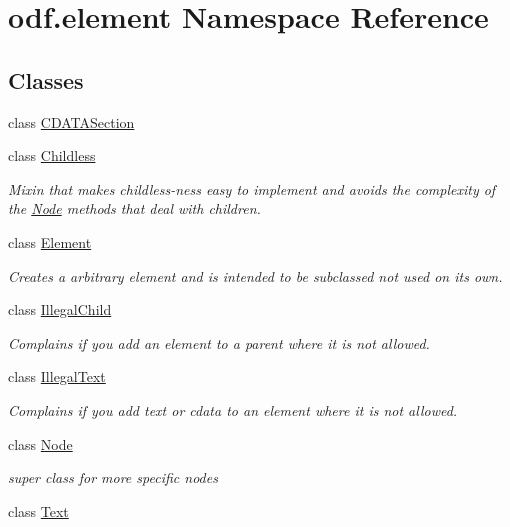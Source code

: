 \hypertarget{namespaceodf_1_1element}{\section{odf.\+element Namespace Reference}
\label{namespaceodf_1_1element}
}
\subsection*{Classes}
\begin{DoxyCompactItemize}
\item 
class \hyperlink{classodf_1_1element_1_1CDATASection}{C\+D\+A\+T\+A\+Section}
\item 
class \hyperlink{classodf_1_1element_1_1Childless}{Childless}
\begin{DoxyCompactList}\small\item\em Mixin that makes childless-\/ness easy to implement and avoids the complexity of the \hyperlink{classodf_1_1element_1_1Node}{Node} methods that deal with children. \end{DoxyCompactList}\item 
class \hyperlink{classodf_1_1element_1_1Element}{Element}
\begin{DoxyCompactList}\small\item\em Creates a arbitrary element and is intended to be subclassed not used on its own. \end{DoxyCompactList}\item 
class \hyperlink{classodf_1_1element_1_1IllegalChild}{Illegal\+Child}
\begin{DoxyCompactList}\small\item\em Complains if you add an element to a parent where it is not allowed. \end{DoxyCompactList}\item 
class \hyperlink{classodf_1_1element_1_1IllegalText}{Illegal\+Text}
\begin{DoxyCompactList}\small\item\em Complains if you add text or cdata to an element where it is not allowed. \end{DoxyCompactList}\item 
class \hyperlink{classodf_1_1element_1_1Node}{Node}
\begin{DoxyCompactList}\small\item\em super class for more specific nodes \end{DoxyCompactList}\item 
class \hyperlink{classodf_1_1element_1_1Text}{Text}
\end{DoxyCompactItemize}
